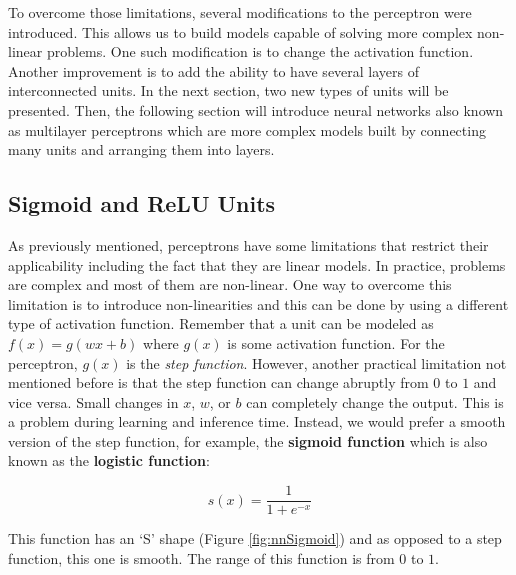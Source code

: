 \documentclass[
  11pt,
]{krantz}
\begin{document}
To overcome those limitations, several modifications to the perceptron were introduced. This allows us to build models capable of solving more complex non-linear problems. One such modification is to change the activation function. Another improvement is to add the ability to have several layers of interconnected units. In the next section, two new types of units will be presented. Then, the following section will introduce neural networks also known as multilayer perceptrons which are more complex models built by connecting many units and arranging them into layers.

\hypertarget{sigmoid-and-relu-units}{%
\subsection{Sigmoid and ReLU Units}\label{sigmoid-and-relu-units}}

As previously mentioned, perceptrons have some limitations that restrict their applicability including the fact that they are linear models. In practice, problems are complex and most of them are non-linear. One way to overcome this limitation is to introduce non-linearities and this can be done by using a different type of activation function. Remember that a unit can be modeled as \(f(x) = g(wx+b)\) where \(g(x)\) is some activation function. For the perceptron, \(g(x)\) is the \emph{step function}. However, another practical limitation not mentioned before is that the step function can change abruptly from \(0\) to \(1\) and vice versa. Small changes in \(x\), \(w\), or \(b\) can completely change the output. This is a problem during learning and inference time. Instead, we would prefer a smooth version of the step function, for example, the \textbf{sigmoid function} which is also known as the \textbf{logistic function}:

\begin{equation}
  s(x) = \frac{1}{1 + e^{-x}}
  \label{eq:sigmoidfunct}
\end{equation}

This function has an `S' shape (Figure \ref{fig:nnSigmoid}) and as opposed to a step function, this one is smooth. The range of this function is from \(0\) to \(1\).
\end{document}
